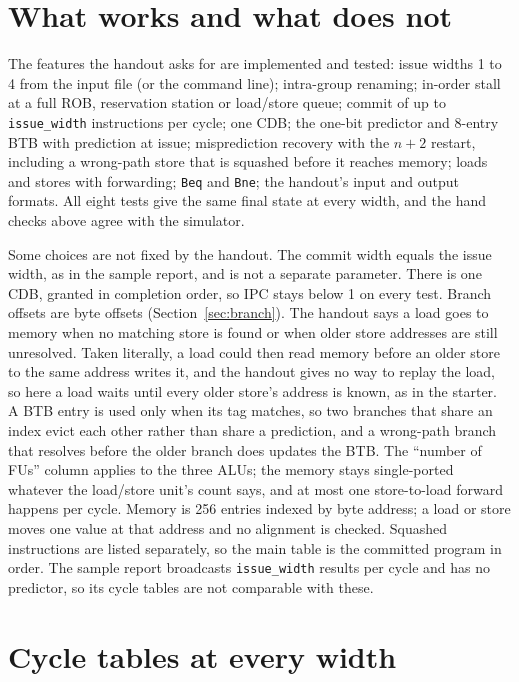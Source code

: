 \documentclass[11pt]{article}
\newcommand{\code}[1]{\texttt{#1}}
\begin{document}
\section{What works and what does not}
\label{sec:works}

The features the handout asks for are implemented and tested: issue widths 1 to 4 from the
input file (or the command line); intra-group renaming; in-order stall at a full ROB, reservation station or load/store queue;
commit of up to \code{issue\_width} instructions per cycle; one CDB; the one-bit predictor
and 8-entry BTB with prediction at
issue; misprediction recovery with the $n+2$ restart, including a wrong-path store that is
squashed before it reaches memory; loads and stores with forwarding; \code{Beq} and
\code{Bne}; the handout's input and output formats. All eight tests give the same final
state at every width, and the hand checks above agree with the simulator.

Some choices are not fixed by the handout. The commit width equals the issue width, as in
the sample report, and is not a separate parameter. There is one CDB, granted in completion
order, so IPC stays below 1 on every test. Branch offsets are byte offsets
(Section~\ref{sec:branch}). The handout says a load goes to memory when no matching store is
found or when older store addresses are still unresolved. Taken literally, a load could then
read memory before an older store to the same address writes it, and the handout gives no
way to replay the load, so here a load waits until every older store's address is known, as
in the starter. A BTB entry is used only when its tag matches, so two branches
that share an index evict each other rather than share a prediction, and a wrong-path branch
that resolves before the older branch does updates the BTB. The ``number of FUs'' column
applies to the three ALUs; the memory stays single-ported whatever the load/store unit's
count says, and at most one store-to-load forward happens per cycle. Memory is 256 entries
indexed by byte address; a load or store moves one value at that address and no alignment is
checked. Squashed instructions are listed separately, so the main table is the committed
program in order. The sample report \cite{sample} broadcasts \code{issue\_width} results per
cycle and has no predictor, so its cycle tables are not comparable with these.




\appendix
\section{Cycle tables at every width}
\label{sec:appendix}
\end{document}
